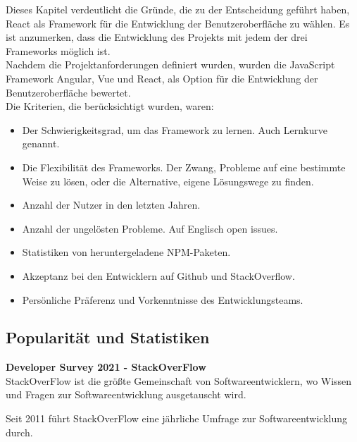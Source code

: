 \begin{flushleft}
  Dieses Kapitel verdeutlicht die Gründe, die zu der Entscheidung geführt haben, React als Framework für die Entwicklung der Benutzeroberfläche zu wählen.
  Es ist anzumerken, dass die Entwicklung des Projekts mit jedem der drei Frameworks möglich ist.
  \\
  Nachdem die Projektanforderungen definiert wurden, wurden die JavaScript Framework Angular, Vue und React, als Option für die Entwicklung der Benutzeroberfläche bewertet.
  \\
  Die Kriterien, die berücksichtigt wurden, waren:
  \begin{itemize}
    \item
          Der Schwierigkeitsgrad, um das Framework zu lernen. Auch Lernkurve genannt.

    \item
          Die Flexibilität des Frameworks.
          Der Zwang, Probleme auf eine bestimmte Weise zu lösen, oder die Alternative, eigene Lösungswege zu finden.

    \item
          Anzahl der Nutzer in den letzten Jahren.

    \item
          Anzahl der ungelösten Probleme. Auf Englisch open issues.

    \item
          Statistiken von heruntergeladene NPM-Paketen.

    \item
          Akzeptanz bei den Entwicklern auf Github und StackOverflow.

    \item
          Persönliche Präferenz und Vorkenntnisse des Entwicklungsteams.
  \end{itemize}

\end{flushleft}

\newpage
\subsection{Popularität und Statistiken}
\begin{flushleft}
  \textbf{Developer Survey 2021 - StackOverFlow}\\
  StackOverFlow ist die größte Gemeinschaft von Softwareentwicklern, wo Wissen und Fragen zur Softwareentwicklung ausgetauscht wird.

  Seit 2011 führt StackOverFlow eine jährliche Umfrage zur Softwareentwicklung durch.
\end{flushleft}

